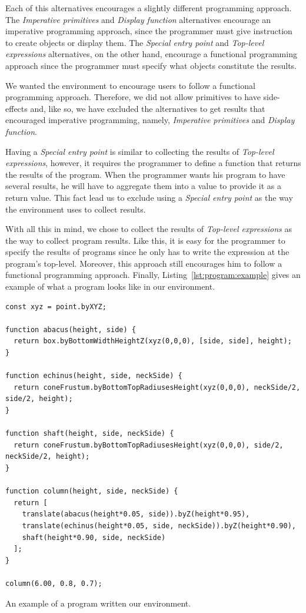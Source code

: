 Each of this alternatives encourages a slightly different programming approach.
The {\it Imperative primitives} and {\it Display function} alternatives encourage an imperative programming approach, since the programmer must give instruction to create objects or display them.
The {\it Special entry point} and {\it Top-level expressions} alternatives, on the other hand, encourage a functional programming approach since the programmer must specify what objects constitute the results.

We wanted the environment to encourage users to follow a functional programming approach.
Therefore, we did not allow primitives to have side-effects and, like so, we have excluded the alternatives to get results that encouraged imperative programming, namely, {\it Imperative primitives} and {\it Display function}.

Having a {\it Special entry point} is similar to collecting the results of {\it Top-level expressions}, however, it requires the programmer to define a function that returns the results of the program.
When the programmer wants his program to have several results, he will have to aggregate them into a value to provide it as a return value.
This fact lead us to exclude using a {\it Special entry point} as the way the environment uses to collect results.

With all this in mind, we chose to collect the results of {\it Top-level expressions} as the way to collect program results.
Like this, it is easy for the programmer to specify the results of programs since he only has to write the expression at the program's top-level.
Moreover, this approach still encourages him to follow a functional programming approach.
Finally, Listing~\ref{lst:program:example} gives an example of what a program looks like in our environment.

\begin{listing}
\begin{verbatim}
const xyz = point.byXYZ;

function abacus(height, side) {
  return box.byBottomWidthHeightZ(xyz(0,0,0), [side, side], height);
}

function echinus(height, side, neckSide) {
  return coneFrustum.byBottomTopRadiusesHeight(xyz(0,0,0), neckSide/2, side/2, height);
}

function shaft(height, side, neckSide) {
  return coneFrustum.byBottomTopRadiusesHeight(xyz(0,0,0), side/2, neckSide/2, height);
}

function column(height, side, neckSide) {
  return [
    translate(abacus(height*0.05, side)).byZ(height*0.95),
    translate(echinus(height*0.05, side, neckSide)).byZ(height*0.90),
    shaft(height*0.90, side, neckSide)
  ];
}

column(6.00, 0.8, 0.7);
\end{verbatim}
\caption{An example of a program written our environment.}
\label{lst:program:example}
\end{listing}


